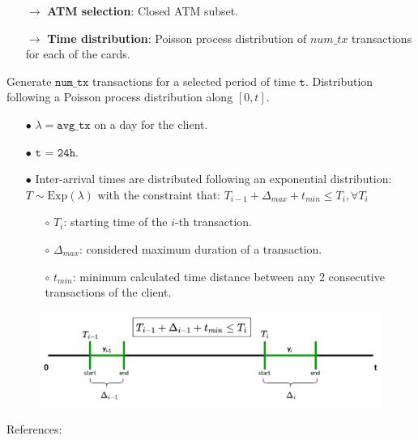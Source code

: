 \documentclass{article}
\begin{document}
\begin{tcolorbox}
  \begin{itemize}
    \item[$\rightarrow$] \textbf{ATM selection}: Closed ATM subset.
    \item[$\rightarrow$] \textbf{Time distribution}: Poisson process distribution of $num\_tx$ 
    transactions for each of the cards.
  \end{itemize}
\end{tcolorbox}


Generate $\texttt{num\_tx}$ transactions for a selected period of time $\texttt{t}$.
Distribution following a Poisson process distribution along $[0,t]$.
\begin{itemize}
    \item[$\bullet$] $\lambda=\texttt{avg\_tx}$ on a day for the client.
    \item[$\bullet$] $\texttt{t = 24h}$.
    \item[$\bullet$] Inter-arrival times are distributed following an exponential distribution: $T \sim \text{Exp}(\lambda)$ with the constraint that: 
    $T_{i-1}+ \Delta_{max} + t_{min} \leq T_i, \forall T_i$
        \begin{itemize}
            \item[$\circ$] $T_{i}$: starting time of the $i$-th transaction.
            \item[$\circ$] $\Delta_{max}$: considered maximum duration of a transaction.
            \item[$\circ$] $t_{min}$: minimum calculated time distance between any 2 consecutive transactions of the client.
        \end{itemize}
\end{itemize}
\begin{figure}[H]
    \centering
    \includegraphics[scale=0.55]{images/tx-generation-dist.png}
\end{figure}


References:
\end{document}
